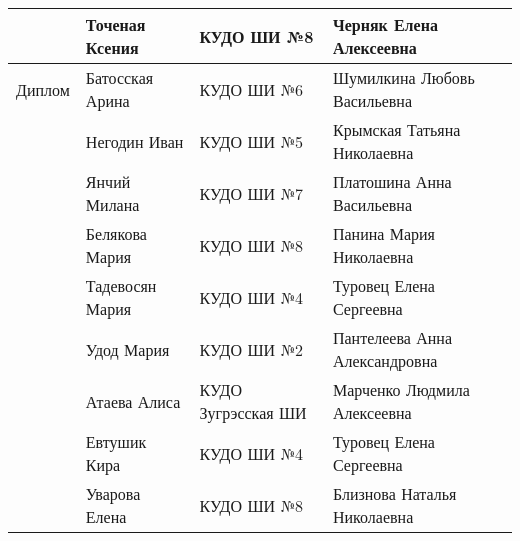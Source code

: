 \begin{longtable}{|l|l|l|l}
\hline             & Точеная Ксения        & КУДО ШИ №8         & Черняк Елена Алексеевна          \\
\hline Диплом      & Батосская Арина       & КУДО ШИ №6         & Шумилкина Любовь Васильевна      \\
\hline             & Негодин Иван          & КУДО ШИ №5         & Крымская Татьяна Николаевна      \\
\hline             & Янчий Милана          & КУДО ШИ №7         & Платошина Анна Васильевна        \\
\hline             & Белякова Мария        & КУДО ШИ №8         & Панина Мария Николаевна          \\
\hline             & Тадевосян Мария       & КУДО ШИ №4         & Туровец Елена Сергеевна          \\
\hline             & Удод Мария            & КУДО ШИ №2         & Пантелеева Анна Александровна    \\
\hline             & Атаева Алиса          & КУДО Зугрэсская ШИ & Марченко Людмила Алексеевна      \\
\hline             & Евтушик Кира          & КУДО ШИ №4         & Туровец Елена Сергеевна          \\
\hline             & Уварова Елена         & КУДО ШИ №8         & Близнова Наталья Николаевна      \\
\end{longtable}
